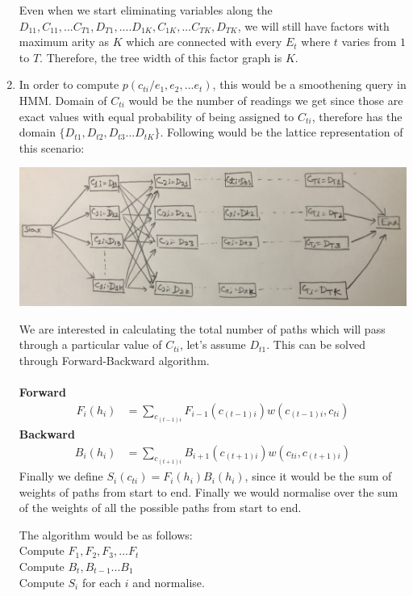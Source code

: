 \documentclass[12pt]{article}
\begin{document}
\begin{enumerate}[label=(\alph*)]
\begin{center}
  \end{center}
  Even when we start eliminating variables along the $D_{11}, C_{11}, ... C_{T1}, D_{T1}, .... D_{1K}, C_{1K}, ... C_{TK}, D_{TK}$, we will still have factors with maximum arity as $K$ which are connected with every $E_t$ where $t$ varies from $1$ to $T$. Therefore, the tree width of this factor graph is $K$.
 \item In order to compute $p(c_{ti}/e_1, e_2, ... e_t)$, this would be a smoothening query in HMM. Domain of $C_{ti}$ would be the number of readings we get since those are exact values with equal probability of being assigned to $C_{ti}$, therefore has the domain $\{D_{t1}, D_{t2}, D_{t3} ... D_{tK}\}$. Following would be the lattice representation of this scenario:
   \begin{center}
  \includegraphics[scale=0.1]{IMG_2299}
  \end{center}
  We are interested in calculating the total number of paths which will pass through a particular value of $C_{ti}$, let's assume $D_{t1}$. This can be solved through Forward-Backward algorithm. \\ \\
  \textbf{Forward}
  \begin{align*}
  F_i(h_i) &= \sum_{c_{(t-1)i}} F_{i-1}(c_{(t-1)i}) w(c_{(t-1)i}, c_{ti})
  \end{align*}
  \textbf{Backward}
  \begin{align*}
  B_i(h_i) &= \sum_{c_{(t+1)i}} B_{i+1}(c_{(t+1)i}) w(c_{ti}, c_{(t+1)i})
  \end{align*}
  Finally we define $S_{i}(c_{ti}) = F_i(h_i) B_i(h_i)$, since it would be the sum of weights of paths from start to end. Finally we would normalise over the sum of the weights of all the possible paths from start to end.
  
  The algorithm would be as follows: \\
  Compute $F_1, F_2, F_3, ... F_t$ \\
  Compute $B_t, B_{t-1} ... B_{1}$ \\
  Compute $S_i$ for each $i$ and normalise.
 
\end{enumerate}
\end{document}
